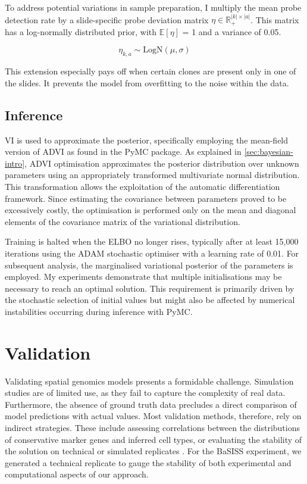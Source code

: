 To address potential variations in sample preparation, I multiply the mean probe detection rate by a slide-specific probe deviation matrix $\eta \in \mathbb{R}_{+}^{|k|\times|a|}$. This matrix has a log-normally distributed prior, with $\mathbb{E}[{\eta}]$ = 1 and a variance of 0.05.

\begin{equation} 
\eta_{k,a} \sim \text{LogN}(\mu, \sigma)
\end{equation}

This extension especially pays off when certain clones are present only in one of the slides. It prevents the model from overfitting to the noise within the data.

\subsection{Inference}
\label{sec:inference}
\Acl{VI} is used to approximate the posterior, specifically employing the mean-field version of \ac{ADVI} as found in the \ac{PyMC} package. As explained in \cref{sec:bayesian-intro}, \ac{ADVI} optimisation approximates the posterior distribution over unknown parameters using an appropriately transformed multivariate normal distribution. This transformation allows the exploitation of the automatic differentiation framework. Since estimating the covariance between parameters proved to be excessively costly, the optimisation is performed only on the mean and diagonal elements of the covariance matrix of the variational distribution.


Training is halted when the \ac{ELBO} no longer rises, typically after at least 15,000 iterations using the ADAM stochastic optimiser \parencite{Kingma2014-um} with a learning rate of 0.01. For subsequent analysis, the marginalised variational posterior of the parameters is employed. My experiments demonstrate that multiple initialisations may be necessary to reach an optimal solution. This requirement is primarily driven by the stochastic selection of initial values but might also be affected by numerical instabilities occurring during inference with \ac{PyMC}.

\section{Validation}
\label{sec:bassis-validation}
Validating spatial genomics models presents a formidable challenge. Simulation studies are of limited use, as they fail to capture the complexity of real data. Furthermore, the absence of ground truth data precludes a direct comparison of model predictions with actual values. Most validation methods, therefore, rely on indirect strategies. These include assessing correlations between the distributions of conservative marker genes and inferred cell types, or evaluating the stability of the solution on technical or simulated replicates \parencite{Li2023-ik}. For the \ac{BaSISS} experiment, we generated a technical replicate to gauge the stability of both experimental and computational aspects of our approach.

